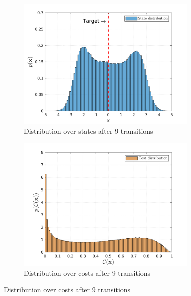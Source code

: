 \begin{figure}[H]
    \vspace{4ex}
  \begin{subfigure}[b]{0.48\linewidth}
    \centering
    \includegraphics[height=0.18\textheight,width=0.95\textwidth]{Chapter3/Figures/trans_traj_hist_4.png} 
    \caption{Distribution over states after 9 transitions} 
    \label{Fig:Re-hist-traj-4} 
  \end{subfigure}
  \hspace{\fill}
  \begin{subfigure}[b]{0.48\linewidth}
    \centering
    \includegraphics[height=0.18\textheight,width=0.95\textwidth]{Chapter3/Figures/trans_cost_hist_4.png} 
    \caption{Distribution over costs after 9 transitions} 
    \label{Fig:Re-hist-cost-4} 
  \end{subfigure} 


\end{figure}
